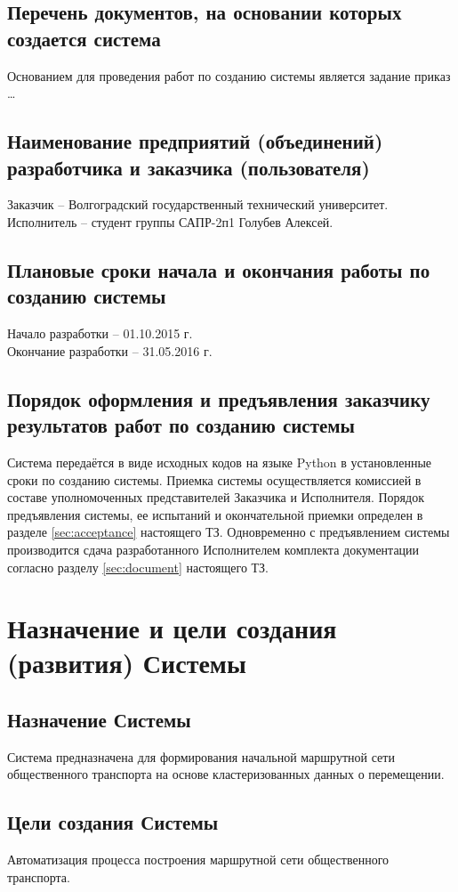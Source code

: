 \section{Перечень документов, на основании которых создается система}
Основанием для проведения работ по созданию системы является задание приказ \ldots

\section{Наименование предприятий (объединений) разработчика и заказчика (пользователя)}
Заказчик -- Волгоградский государственный технический университет.\\
Исполнитель -- студент группы САПР-2п1 Голубев Алексей.

\section{Плановые сроки начала и окончания работы по созданию системы}
Начало разработки -- 01.10.2015 г.\\
Окончание разработки -- 31.05.2016 г.

\section{Порядок оформления и предъявления заказчику результатов работ по созданию системы}
Система передаётся в виде исходных кодов на языке Python в установленные сроки по созданию системы.
Приемка системы осуществляется комиссией в составе уполномоченных представителей Заказчика и Исполнителя. 
Порядок предъявления системы, ее испытаний и окончательной приемки определен в разделе \ref{sec:acceptance} 
настоящего ТЗ. Одновременно с предъявлением системы производится сдача разработанного Исполнителем комплекта документации согласно разделу \ref{sec:document} настоящего ТЗ.

\chapter{Назначение и цели создания (развития) Системы}
\section{Назначение Системы}
Система предназначена для формирования начальной маршрутной сети общественного транспорта на основе 
кластеризованных данных о перемещении.

\section{Цели создания Системы}
Автоматизация процесса построения маршрутной сети общественного транспорта.

